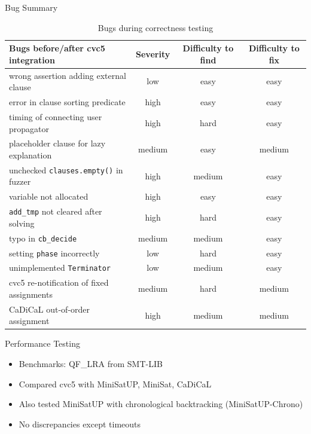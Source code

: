 \documentclass{beamer}
\newcommand*{\code}[1]{\lstinline[basicstyle=\ttfamily, breaklines]|#1|}
\begin{document}
\begin{frame}{Bug Summary}
  \scriptsize
  \begin{table}
    \centering
    \begin{tabular}{|l|c|c|c|}
      \hline
      \textbf{Bugs before/after cvc5 integration} & \textbf{Severity} & \textbf{Difficulty to find} & \textbf{Difficulty to fix} \\
      \hline
      wrong assertion adding external clause & low & easy & easy \\
      error in clause sorting predicate & high & easy & easy \\
      timing of connecting user propagator & high & hard & easy \\
      placeholder clause for lazy explanation & medium & easy & medium \\
      \hline
      unchecked \code{clauses.empty()} in fuzzer & high & medium & easy \\
      variable not allocated & high & easy & easy \\
      \code{add_tmp} not cleared after solving & high & hard & easy \\
      typo in \code{cb_decide} & medium & medium & easy \\
      setting \code{phase} incorrectly & low & hard & easy \\
      unimplemented \code{Terminator} & low & medium & easy \\
      \hline
      cvc5 re-notification of fixed assignments & medium & hard & medium \\
      CaDiCaL out-of-order assignment & high & medium & medium \\
      \hline
    \end{tabular}
    \caption{Bugs during correctness testing}
  \end{table}
\end{frame}

\begin{frame}{Performance Testing}
  \begin{itemize}
    \item Benchmarks: QF\_LRA from SMT-LIB
    \item Compared cvc5 with MiniSatUP, MiniSat, CaDiCaL
    \item Also tested MiniSatUP with chronological backtracking (MiniSatUP-Chrono)
    \item No discrepancies except timeouts
  \end{itemize}
\end{frame}
\end{document}
